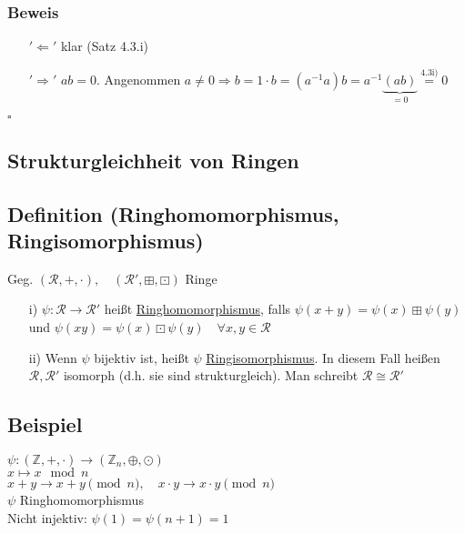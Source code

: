 \documentclass[12pt,titlepage, pdf]{article}
\newcommand{\uline}[1]{\underline{#1}}
\newcommand{\qed}{\hfill$\square$}
\renewcommand{\>}{\rightarrow}
\renewcommand{\*}{\cdot}
\begin{document}
\subsubsection*{Beweis}
\begin{itemize}
	\item[$'\Leftarrow'$] klar (Satz 4.3.i)
	\item[$'\Rightarrow'$] $ab = 0$. Angenommen $a \neq 0 \Rightarrow b=1 \cdot b = (a^{-1}a)b = a^{-1}\underbrace{(ab)}_{= 0} \overset{\textrm{4.3i)}}{=} 0$
\end{itemize}
\qed
\subsection*{Strukturgleichheit von Ringen}
\subsection{Definition (Ringhomomorphismus, Ringisomorphismus)}
Geg. $(\mathcal{R}, + , \cdot),\quad (\mathcal{R}', \boxplus, \boxdot)$  Ringe
\begin{itemize}
	\item[i)]$\psi: \mathcal{R} \rightarrow \mathcal{R}'$ heißt \uline{Ringhomomorphismus}, falls $\psi(x+y) = \psi(x) \boxplus \psi(y)$ und $\psi(xy)= \psi(x) \boxdot \psi(y)\quad \forall x,y \in \mathcal{R}$
	\item[ii)] Wenn $\psi$ bijektiv ist, heißt $\psi$ \uline{Ringisomorphismus}. In diesem Fall heißen $\mathcal{R}, \mathcal{R}'$ isomorph (d.h. sie sind strukturgleich). Man schreibt $\mathcal{R} \cong \mathcal{R}'$
\end{itemize}

\subsection{Beispiel}
$\psi: (\mathbb{Z}, + ,\cdot) \rightarrow (\mathbb{Z}_n,\oplus, \odot)$\\
\noindent\hspace*{17mm}$x \mapsto x \mod n$\\
$x +y \rightarrow x+y \pmod{n},\quad x \cdot y \rightarrow x \cdot y \pmod{n}$\\
$\psi$ Ringhomomorphismus\\
Nicht injektiv: $\psi(1)=\psi(n+1)=1$
\end{document}
